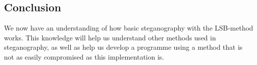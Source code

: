 

\subsection*{Conclusion}
We now have an understanding of how basic steganography with the LSB-method works. This knowledge will help us understand other methods used in steganography, as well as help us develop a programme using a method that is not as easily compromised as this implementation is.